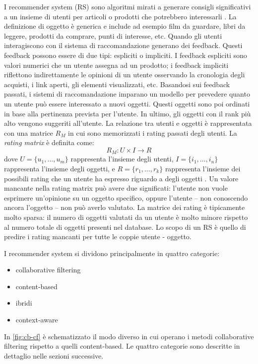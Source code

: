 I recommender system (RS) sono algoritmi mirati a generare consigli significativi a un insieme di utenti per articoli o prodotti che potrebbero interessarli \cite{recsys-definition}. La definizione di oggetto è generica e include ad esempio film da guardare, libri da leggere, prodotti da comprare, punti di interesse, etc. 
Quando gli utenti interagiscono con il sistema di raccomandazione generano dei feedback. Questi feedback possono essere di due tipi: espliciti o impliciti. I feedback espliciti sono valori numerici che un utente assegna ad un prodotto; i feedback impliciti riflettono indirettamente le opinioni di un utente osservando la cronologia degli acquisti, i link aperti, gli elementi visualizzati, etc.
Basandosi sui feedback passati, i sistemi di raccomandazione imparano un modello per prevedere quanto un utente può essere interessato a nuovi oggetti. Questi oggetti sono poi ordinati in base alla pertinenza prevista per l'utente. In ultimo, gli oggetti con il rank più alto vengono suggeriti all'utente. La relazione tra utenti e oggetti è rappresentata con una matrice $R_M$ in cui sono memorizzati i rating passati degli utenti.
La \textit{rating matrix} è definita come: 
$$
R_M: U \times I \rightarrow R
$$
dove $U = \{u_1, \dots, u_m\}$ rappresenta l'insieme degli utenti, $I = \{i_1,\dots, i_n\}$ rappresenta l'insieme degli oggetti, e $R = \{r_1, \dots, r_k\}$ rappresenta l'insieme dei possibili rating che un utente ha espresso riguardo a degli oggetti \cite{survey-mattia}. Un valore mancante nella rating matrix può avere due significati: l'utente non vuole esprimere un'opinione su un oggetto specifico, oppure l'utente -- non conoscendo ancora l'oggetto -- non può averlo valutato. La matrice dei rating è tipicamente molto sparsa: il numero di oggetti valutati da un utente è molto minore rispetto al numero totale di oggetti presenti nel database. Lo scopo di un RS è quello di predire i rating mancanti per tutte le coppie utente - oggetto.

\vspace{5mm}
\noindent I recommender system si dividono principalmente in quattro categorie:
\begin{itemize}
	\item collaborative filtering
	\item content-based
	\item ibridi
	\item context-aware
\end{itemize}

\noindent In \autoref{fig:cb-cf} è schematizzato il modo diverso in cui operano i metodi collaborative filtering rispetto a quelli content-based. Le quattro categorie sono descritte in dettaglio nelle sezioni successive.


